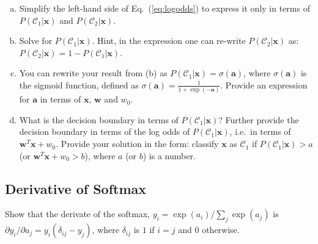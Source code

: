\documentclass[11pt,a4paper]{article}
\begin{document}
\begin{enumerate}[(a)]
\item Simplify the left-hand side of Eq.~(\ref{eq:logodds}) to express it only in terms of $P(\mathcal{C}_1|\mathbf{x})$ and $P(\mathcal{C}_2|\mathbf{x})$.
\item Solve for $P(\mathcal{C}_1|\mathbf{x})$. Hint, in the expression one can re-write $P(\mathcal{C}_2|\mathbf{x})$ as: $P(\mathcal{C}_2|\mathbf{x}) = 1 - P(\mathcal{C}_1|\mathbf{x})$.
\item You can rewrite your result from (b) as $P(\mathcal{C}_1|\mathbf{x})=\sigma(\mathbf{a})$, where $\sigma(\mathbf{a})$ is the sigmoid function, defined as $\sigma(\mathbf{a})=\frac{1}{1+\exp{(-\mathbf{a})}}$. Provide an expression for $\mathbf{a}$ in terms of $\mathbf{x}$, $\mathbf{w}$ and $w_0$.
\item What is the decision boundary in terms of $P(\mathcal{C}_1|\mathbf{x})$? Further provide the decision boundary in terms of the log odds of $P(\mathcal{C}_1|\mathbf{x})$, i.e.~in terms of $\mathbf{w}^T\mathbf{x} + w_0$. Provide your solution in the form: classify $\mathbf{x}$ as $\mathcal{C}_1$ if $P(\mathcal{C}_1|\mathbf{x})>a$ (or $\mathbf{w}^T\mathbf{x} + w_0>b$), where $a$ (or $b$) is a number.
\end{enumerate}


\subsection{Derivative of Softmax}

Show that the derivate of the softmax, $y_{i} = \exp(a_{i}) / \sum_{j} \exp(a_{j})$ is $\partial y_{i} / \partial a_{j} = y_{i}(\delta_{ij} - y_{j})$, where $\delta_{ij}$ is $1$ if $i = j$ and $0$ otherwise. 
\end{document}

